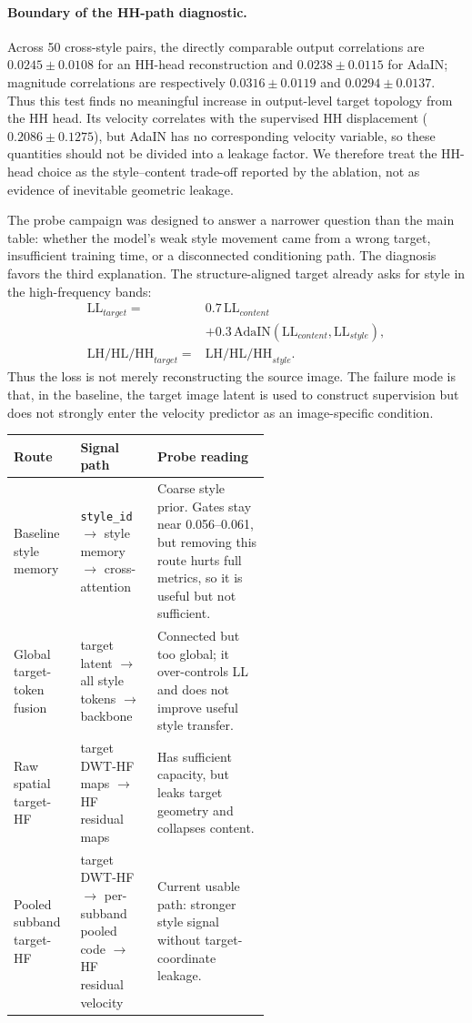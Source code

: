 \documentclass[letterpaper]{article}
\begin{document}
\paragraph{Boundary of the HH-path diagnostic.}
Across 50 cross-style pairs, the directly comparable output correlations are
$0.0245\mathbin{\pm}0.0108$ for an HH-head reconstruction and
$0.0238\mathbin{\pm}0.0115$ for AdaIN; magnitude correlations are respectively
$0.0316\mathbin{\pm}0.0119$ and $0.0294\mathbin{\pm}0.0137$. Thus this test finds no
meaningful increase in output-level target topology from the HH head. Its velocity correlates
with the supervised HH displacement ($0.2086\mathbin{\pm}0.1275$), but AdaIN has no
corresponding velocity variable, so these quantities should not be divided into a leakage
factor. We therefore treat the HH-head choice as the style--content trade-off reported by the
ablation, not as evidence of inevitable geometric leakage.

The probe campaign was designed to answer a narrower question than the main table:
whether the model's weak style movement came from a wrong target, insufficient training
time, or a disconnected conditioning path. The diagnosis favors the third explanation.
The structure-aligned target already asks for style in the high-frequency bands:
\begingroup
\small
\[
\begin{aligned}
\mathrm{LL}_{target}={}&0.7\,\mathrm{LL}_{content} \\
  &+0.3\,\mathrm{AdaIN}(\mathrm{LL}_{content},\mathrm{LL}_{style}),\\
\mathrm{LH/HL/HH}_{target}={}&\mathrm{LH/HL/HH}_{style}.
\end{aligned}
\]
\endgroup
Thus the loss is not merely reconstructing the source image. The failure mode is that,
in the baseline, the target image latent is used to construct supervision but does not
strongly enter the velocity predictor as an image-specific condition.

\begin{center}
\footnotesize
\begin{tabularx}{\linewidth}{p{0.26\linewidth}p{0.30\linewidth}X}
\toprule
Route & Signal path & Probe reading \\
\midrule
Baseline style memory & \texttt{style\_id} \(\rightarrow\) style memory \(\rightarrow\) cross-attention & Coarse style prior. Gates stay near 0.056--0.061, but removing this route hurts full metrics, so it is useful but not sufficient. \\
Global target-token fusion & target latent \(\rightarrow\) all style tokens \(\rightarrow\) backbone & Connected but too global; it over-controls LL and does not improve useful style transfer. \\
Raw spatial target-HF & target DWT-HF maps \(\rightarrow\) HF residual maps & Has sufficient capacity, but leaks target geometry and collapses content. \\
Pooled subband target-HF & target DWT-HF \(\rightarrow\) per-subband pooled code \(\rightarrow\) HF residual velocity & Current usable path: stronger style signal without target-coordinate leakage. \\
\bottomrule
\end{tabularx}
\normalsize
\end{center}
\end{document}
